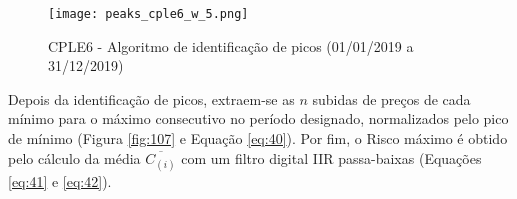 \begin{itemize}
    \begin{figure}[!htb]
        \texttt{[image: peaks\_cple6\_w\_5.png]}
        \centering
        \caption{CPLE6 - Algoritmo de identificação de picos (01/01/2019 a 31/12/2019)}
        \label{fig:106}
    \end{figure}



    Depois da identificação de picos, extraem-se as \begin{math} n \end{math} subidas de preços de cada mínimo para o máximo consecutivo no período designado, normalizados pelo pico de mínimo (Figura \ref{fig:107} e Equação \ref{eq:40}). Por fim, o Risco máximo é obtido pelo cálculo da média \begin{math} \overline{C_{(i)}} \end{math} com um filtro digital IIR passa-baixas (Equações \ref{eq:41} e \ref{eq:42}).


\end{itemize}
